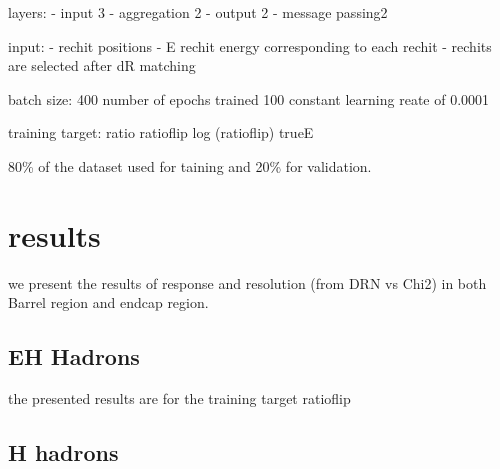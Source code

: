 layers:
- input 3
- aggregation 2
- output 2
- message passing2 

input:
- rechit positions
- E rechit energy corresponding to each rechit
- rechits are selected after dR matching %

batch size: 400
number of epochs trained 100
constant learning reate of 0.0001

training target:
ratio
ratioflip
log (ratioflip)
trueE

80\% of the dataset used for taining and 20\% for validation.

\section{results}
we present the results of response and resolution (from DRN vs Chi2) in  both Barrel region and endcap region.

\subsection{EH Hadrons}
the presented results are for the training target ratioflip





\subsection{H hadrons}




